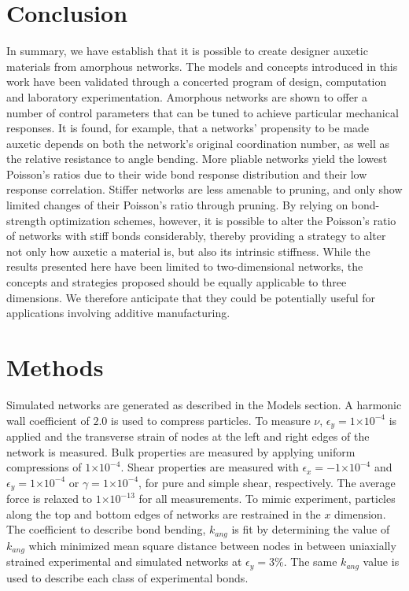 \documentclass[9pt,twocolumn,twoside]{pnas-new}
\providecommand{\e}[1]{\ensuremath{\times 10^{#1}}}
\begin{document}
\section*{Conclusion}
In summary, we have establish that it is possible to create designer auxetic materials from amorphous networks. The models and concepts introduced in this work have been validated through a concerted program of design, computation and laboratory experimentation. Amorphous networks are shown to offer a number of control parameters that can be tuned to achieve particular mechanical responses. It is found, for example, that a networks' propensity to be made auxetic depends on both the network's original coordination number, as well as the relative resistance to angle bending. More pliable networks yield the lowest Poisson's ratios due to their wide bond response distribution and their low response correlation. Stiffer networks are less amenable to pruning, and only show limited changes of their Poisson's ratio through pruning. By relying on bond-strength optimization schemes, however, it is possible to alter the Poisson's ratio of networks with stiff bonds considerably, thereby providing a strategy to alter not only how auxetic a material is, but also its intrinsic stiffness. While the results presented here have been limited to two-dimensional networks, the concepts and strategies proposed should be equally applicable to three dimensions. We therefore anticipate that they could be potentially useful for applications involving additive manufacturing.






\section*{Methods}
Simulated networks are generated as described in the Models section.  A harmonic wall coefficient of $2.0$ is used to compress particles.  To measure $\nu$, $\epsilon_{y} = 1\e{-4}$ is applied and the transverse strain of nodes at the left and right edges of the network is measured.  Bulk properties are measured by applying uniform compressions of $1\e{-4}$.  Shear properties are measured with $\epsilon_{x}=-1\e{-4}$ and $\epsilon_{y}=1\e{-4}$ or $\gamma=1\e{-4}$, for pure and simple shear, respectively.  The average force is relaxed to $1\e{-13}$ for all measurements.  To mimic experiment, particles along the top and bottom edges of networks are restrained in the $x$ dimension.
The coefficient to describe bond bending, $k_{ang}$ is fit by determining the value of $k_{ang}$ which minimized mean square distance between nodes in between uniaxially strained experimental and simulated networks at $\epsilon_{y}=3\%$.  The same $k_{ang}$ value is used to describe each class of experimental bonds.
\end{document}

